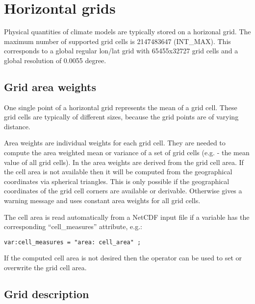 \section{Horizontal grids}
\label{HORIZONTAL_GRIDS}

Physical quantities of climate models are typically stored on a horizonal grid.
The maximum number of supported grid cells is 2147483647 (INT\_MAX).
This corresponds to a global regular lon/lat grid with 65455x32727
grid cells and a global resolution of 0.0055 degree.

\subsection{Grid area weights}
\label{GRID_AREA_WEIGHTS}

One single point of a horizontal grid represents the mean of a grid cell.
These grid cells are typically of different sizes, because the grid points are of varying distance.

Area weights are individual weights for each grid cell. 
They are needed to compute the area weighted mean or
variance of a set of grid cells (e.g.  - the mean value of all grid cells).
In {\CDO} the area weights are derived from the grid cell area.
If the cell area is not available then it will be computed from the geographical coordinates via spherical triangles.
This is only possible if the geographical coordinates of the grid cell corners are available or derivable.
Otherwise {\CDO} gives a warning message and uses constant area weights for all grid cells.

The cell area is read automatically from a NetCDF input file if a variable has the
corresponding ``cell\_measures'' attribute, e.g.:

\begin{lstlisting}[frame=single, backgroundcolor=\color{pcolor1}, basicstyle=\small]
var:cell_measures = "area: cell_area" ;
\end{lstlisting}

If the computed cell area is not desired 
then the {\CDO} operator  can be used to
set or overwrite the grid cell area.

\subsection{Grid description}
\label{GRID_DESCRIPTION}


